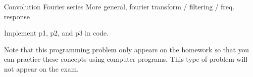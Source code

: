 \documentclass{ee102_pset}
\author{Ayush Pandey}
\begin{document}
Convolution 
Fourier series 
More general, fourier transform / filtering / freq. response 

Implement p1, p2, and p3 in code. 

{\color{red}Note that this programming problem only appears on the homework so that you can practice these concepts using computer programs. This type of problem will not appear on the exam.}
\end{document}
